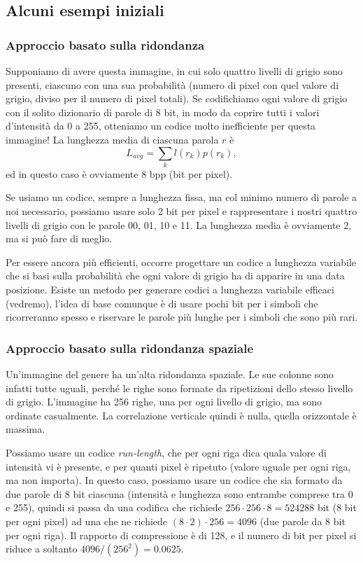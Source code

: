 \documentclass[a4paper,11pt]{article}
\begin{document}
\subsection{Alcuni esempi iniziali}
\subsubsection{Approccio basato sulla ridondanza}
Supponiamo di avere questa immagine, in cui solo quattro livelli di grigio sono presenti, ciascuno con una sua probabilità (numero di pixel con quel valore di grigio, diviso per il numero di pixel totali).
Se codifichiamo ogni valore di grigio con il solito dizionario di parole di 8 bit, in modo da coprire tutti i valori d'intensità da 0 a 255, otteniamo un codice molto inefficiente per questa immagine!
La lunghezza media di ciascuna parola $r$ è
\[
L_{avg} = \sum_{k} l(r_k) p(r_k),
\]
ed in questo caso è ovviamente 8 bpp (bit per pixel).
\par
Se usiamo un codice, sempre a lunghezza fissa, ma col minimo numero di parole a noi necessario, possiamo usare solo 2 bit per pixel e rappresentare i nostri quattro livelli di grigio con le parole
00, 01, 10 e 11. La lunghezza media è ovviamente 2, ma si può fare di meglio.
\par
Per essere ancora più efficienti, occorre progettare un codice a lunghezza variabile che si basi sulla probabilità che ogni valore di grigio ha di apparire in una data posizione.
Esiste un metodo per generare codici a lunghezza variabile efficaci (vedremo), l'idea di base comunque è di usare pochi bit per i simboli che ricorreranno spesso e riservare le parole più lunghe
per i simboli che sono più rari.

\subsubsection{Approccio basato sulla ridondanza spaziale}
Un'immagine del genere ha un'alta ridondanza spaziale. Le sue colonne sono infatti tutte uguali, perché le righe sono formate da ripetizioni dello stesso livello di grigio.
L'immagine ha 256 righe, una per ogni livello di grigio, ma sono ordinate casualmente. La correlazione verticale quindi è nulla, quella orizzontale è massima.
\par
Possiamo usare un codice \textit{run-length}, che per ogni riga dica quala valore di intensità vi è presente, e per quanti pixel è ripetuto (valore uguale per ogni riga, ma non importa).
In questo caso, possiamo usare un codice che sia formato da due parole di 8 bit ciascuna (intensità e lunghezza sono entrambe comprese tra 0 e 255), quindi si passa da una codifica che richiede
$256 \cdot 256 \cdot 8 = 524288$ bit (8 bit per ogni pixel) ad una che ne richiede $(8 \cdot 2) \cdot 256 = 4096$ (due parole da 8 bit per ogni riga). Il rapporto di compressione è di 128, e il numero di bit
per pixel si riduce a soltanto $4096/(256^2) = 0.0625$.
\end{document}
